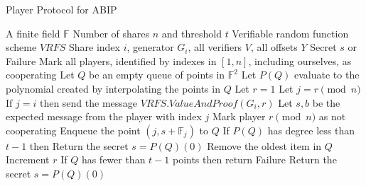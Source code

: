 \documentclass{dalcsthesis}
\begin{document}
\begin{algorithm}
  \caption{Player Protocol for ABIP}
  \label{alg:ABIP:Player}
  \begin{algorithmic}
    \INPUT A finite field $\mathbb{F}$
    \INPUT Number of shares $n$ and threshold $t$
    \INPUT Verifiable random function scheme $VRFS$
    \INPUT Share index $i$, generator $G_i$, all verifiers $V$, all offsets $Y$
    \OUTPUT Secret $s$ or Failure
    \STATE Mark all players, identified by indexes in $[1, n]$, including ourselves, as cooperating
    \STATE Let $Q$ be an empty queue of points in $\mathbb{F}^2$
    \STATE Let $P(Q)$ evaluate to the polynomial created by interpolating the points in $Q$
    \STATE Let $r = 1$
      \STATE Let $j = r \pmod{n}$
      \STATE If $j = i$ then send the message $VRFS.ValueAndProof(G_i, r)$
      \STATE Let $s, b$ be the expected message from the player with index $j$
        \STATE Mark player $r \pmod{n}$ as not cooperating
      \ELSE
        \STATE Enqueue the point $(j, s + \mathbb{F}_j)$ to $Q$
          \STATE If $P(Q)$ has degree less than $t-1$ then Return the secret $s = P(Q)(0)$
          \STATE Remove the oldest item in $Q$
        \ENDIF
      \ENDIF
      \STATE Increment $r$
    \ENDWHILE
    \STATE If $Q$ has fewer than $t-1$ points then return Failure
    \STATE Return the secret $s = P(Q)(0)$
  \end{algorithmic}
\end{algorithm}
\end{document}
